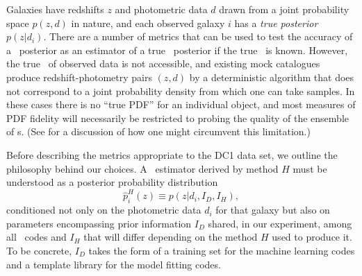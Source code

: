 Galaxies have redshifts $z$ and photometric data $d$ drawn from a joint probability space $p(z, d)$ in nature, and each observed galaxy $i$ has a \textit{true posterior \pzpdf}\ $p(z \vert d_{i})$.%
There are a number of metrics that can be used to test the accuracy of a \pz\ posterior as an estimator of a true \pz\ posterior if the true \pzpdf\ is known.
However, the true \pzpdf\ of observed data is not accessible, and existing mock catalogues produce redshift-photometry pairs $(z, d)$ by a deterministic algorithm that does not correspond to a joint probability density from which one can take samples.
In these cases there is no ``true PDF'' for an individual object, and most measures of PDF fidelity will necessarily be restricted to probing the quality of the ensemble of \pzpdf s.
(See  for a discussion of how one might circumvent this limitation.)

Before describing the metrics appropriate to the DC1 data set, we outline the philosophy behind our choices.
A \pzpdf\ estimator derived by method $H$ must be understood as a posterior probability distribution
\begin{equation}
\label{eq:pzpdf}
\hat{p}^{H}_{i}(z) \equiv p(z \vert d_{i}, I_{D}, I_{H}),
\end{equation}
conditioned not only on the photometric data $d_{i}$ for that galaxy but also on parameters encompassing prior information $I_{D}$ shared, in our experiment, among all \pzpdf\ codes and $I_{H}$ that will differ depending on the method $H$ used to produce it.
To be concrete, $I_{D}$ takes the form of a training set for the machine learning codes and a template library for the model fitting codes.

